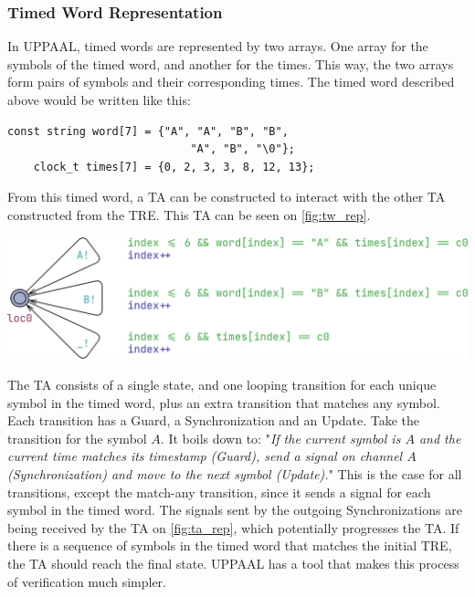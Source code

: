 \subsubsection{Timed Word Representation}\label{subsubsec:tw_rep}
In UPPAAL, timed words are represented by two arrays. One array for the symbols of the timed word, and another for the times. This way, the two arrays form pairs of symbols and their corresponding times. The timed word described above would be written like this:

\vspace{0.75em}
\begin{lstlisting}[basicstyle=\scriptsize]
    const string word[7] = {"A", "A", "B", "B", 
                            "A", "B", "\0"};
    clock_t times[7] = {0, 2, 3, 3, 8, 12, 13};
\end{lstlisting}
\label{lstlisting:timed_word}
\vspace{0.75em}

From this timed word, a TA can be constructed to interact with the other TA constructed from the TRE. This TA can be seen on \cref{fig:tw_rep}.

\vspace{0.75em}
\begin{center}
    \includegraphics[width=\columnwidth]{Documents/Diagrams/CheckingFigures/checking_twrep.png}
    \label{fig:tw_rep}
\end{center}
\vspace{0.75em}

The TA consists of a single state, and one looping transition for each unique symbol in the timed word, plus an extra transition that matches any symbol.
Each transition has a Guard, a Synchronization and an Update. Take the transition for the symbol $A$.
It boils down to: "\textit{If the current symbol is $A$ and the current time matches its timestamp (Guard), send a signal on channel $A$(Synchronization) and move to the next symbol (Update).}"
This is the case for all transitions, except the match-any transition, since it sends a signal for each symbol in the timed word. The signals sent by the outgoing Synchronizations are being received by the TA on \cref{fig:ta_rep}, which potentially progresses the TA. If there is a sequence of symbols in the timed word that matches the initial TRE, the TA should reach the final state. UPPAAL has a tool that makes this process of verification much simpler.

